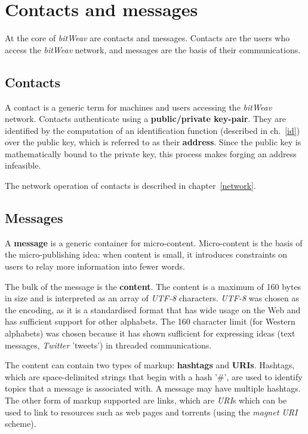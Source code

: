 \documentclass[10pt,a4paper,onecolumn]{article}
\begin{document}
\section{Contacts and messages}
\label{ContactsAndMessages}
At the core of \textit{bitWeav} are contacts and messages. Contacts are the users who access the \textit{bitWeav} network, and messages are the basis of their communications.

\subsection*{Contacts}
A contact is a generic term for machines and users accessing the \textit{bitWeav} network. Contacts authenticate using a \textbf{public/private key-pair}. They are identified by the computation of an identification function (described in ch.~\ref{id}) over the public key, which is referred to as their \textbf{address}. Since the public key is mathematically bound to the private key, this process makes forging an address infeasible.

The network operation of contacts is described in chapter~\ref{network}.

\subsection*{Messages}
A \textbf{message} is a generic container for micro-content. Micro-content is the basis of the micro-publishing idea: when content is small, it introduces constraints on users to relay more information into fewer words.

The bulk of the message is the \textbf{content}. The content is a maximum of 160 bytes in size and is interpreted as an array of \textit{UTF-8} characters. \textit{UTF-8} was chosen as the encoding, as it is a standardised format that has wide usage on the Web and has sufficient support for other alphabets. The 160 character limit (for Western alphabets) was chosen because it has shown sufficient for expressing ideas (text messages, \textit{Twitter} 'tweets') in threaded communications. 

The content can contain two types of markup: \textbf{hashtags} and \textbf{URIs}. Hashtags, which are space-delimited strings that begin with a hash '\#', are used to identify topics that a message is associated with. A message may have multiple hashtags. The other form of markup supported are links, which are \textit{URI}s which can be used to link to resources such as web pages and torrents (using the \textit{magnet URI} scheme).
\end{document}
